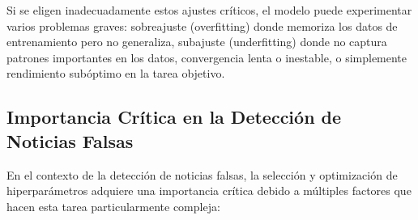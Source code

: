 Si se eligen inadecuadamente estos ajustes críticos, el modelo puede experimentar varios problemas graves: sobreajuste (overfitting) donde memoriza los datos de entrenamiento pero no generaliza, subajuste (underfitting) donde no captura patrones importantes en los datos, convergencia lenta o inestable, o simplemente rendimiento subóptimo en la tarea objetivo.

\subsection{Importancia Crítica en la Detección de Noticias Falsas}

En el contexto de la detección de noticias falsas, la selección y optimización de hiperparámetros adquiere una importancia crítica debido a múltiples factores que hacen esta tarea particularmente compleja:

